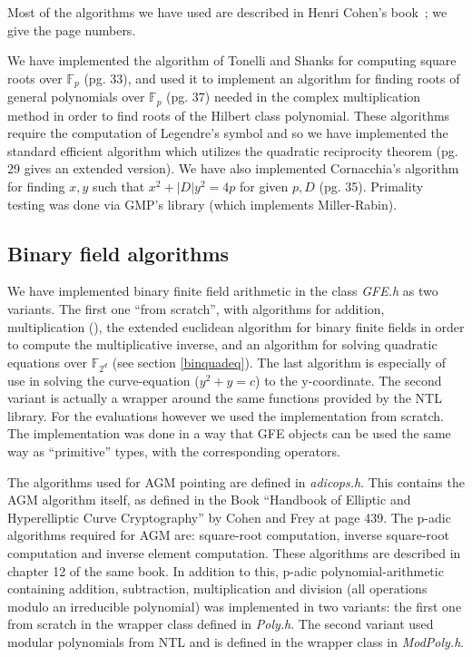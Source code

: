\documentclass[11pt,english]{article}
\begin{document}
Most of the algorithms we have used are described in Henri Cohen's book~\cite{Co96}; we give the page numbers.

We have implemented the algorithm of Tonelli and Shanks for computing square roots over $\mathbb{F}_p$ (pg. 33), and used 
it to implement an algorithm for finding roots of general polynomials over $\mathbb{F}_p$ (pg. 37) needed in the complex multiplication
method in order to find roots of the Hilbert class polynomial. These algorithms require the computation of Legendre's symbol
and so we have implemented the standard efficient algorithm which utilizes the quadratic reciprocity theorem (pg. 29 gives an extended version).
We have also implemented Cornacchia's algorithm for finding $x,y$ such that $x^2+|D|y^2=4p$ for given $p,D$ (pg. 35).
Primality testing was done via GMP's library (which implements Miller-Rabin). 

\subsection{Binary field algorithms}
We have implemented binary finite field arithmetic in the class \emph{GFE.h} as two variants. The first one ``from scratch'', with algorithms for addition, multiplication (\cite{715867}), the extended euclidean algorithm for binary finite fields in order to compute the multiplicative inverse, and an algorithm for solving quadratic equations over $\mathbb{F}_{2^d}$ (see section \ref{binquadeq}). The last algorithm is especially of use in solving the curve-equation ($y^2+y=c$) to the y-coordinate. The second variant is actually a wrapper around the same functions provided by the NTL library. For the evaluations however we used the implementation from scratch. The implementation was done in a way that GFE objects can be used the same way as ``primitive'' types, with the corresponding operators.

The algorithms used for AGM pointing are defined in \emph{adicops.h}. This contains the AGM algorithm itself, as defined in the Book ``Handbook of Elliptic and Hyperelliptic Curve Cryptography'' by Cohen and Frey \cite{handbook} at page 439. The p-adic algorithms required for AGM are: square-root computation, inverse square-root computation and inverse element computation. These algorithms are described in chapter 12 of the same book. In addition to this, p-adic polynomial-arithmetic containing addition, subtraction, multiplication and division (all operations modulo an irreducible polynomial) was implemented in two variants: the first one from scratch in the wrapper class defined in \emph{Poly.h}. The second variant used modular polynomials from NTL and is defined in the wrapper class in \emph{ModPoly.h}.
\end{document}
